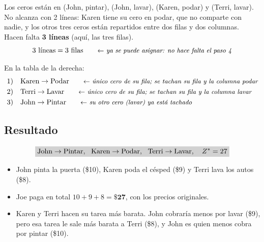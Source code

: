 \documentclass[11pt,a4paper]{article}
\newcommand{\marco}[3]{%
  \foreach \i in {2,...,#2} \foreach \j in {2,...,#3}
    \draw[gray!60, very thin] (#1-\i-\j.north west) rectangle (#1-\i-\j.south east);
  \draw[semithick] (#1-2-2.north west) rectangle (#1-#2-#3.south east);}
\newcommand{\tfila}[3]{\draw[tapa] (#1-#2-2.west) -- (#1-#2-#3.east);}
\newcommand{\pie}[2]{\node[below=1.5mm of #1, font=\scriptsize\itshape] {#2};}
\newcommand{\cero}[1]{\node[asig] at (#1) {};}
\newcommand{\flecha}[3]{\draw[-{Stealth[length=2.4mm]}, thick] (#1.east) -- node[above, font=\scriptsize, align=center] {#3} (#1.east -| #2.west);}
\begin{document}
\begin{center}
\end{center}
Los ceros están en (John, pintar), (John, lavar), (Karen, podar) y (Terri, lavar). No alcanza con 2 líneas: Karen
tiene su cero en podar, que no comparte con nadie, y los otros tres ceros están repartidos entre dos filas y dos
columnas. Hacen falta \textbf{3 líneas} (aquí, las tres filas).
\[
3 \text{ líneas} = 3 \text{ filas} \nota{ya se puede asignar: no hace falta el paso 4}
\]

En la tabla de la derecha:
\begin{align*}
1)\quad & \text{Karen} \to \text{Podar} \nota{único cero de su fila; se tachan su fila y la columna podar}\\
2)\quad & \text{Terri} \to \text{Lavar} \nota{único cero de su fila; se tachan su fila y la columna lavar}\\
3)\quad & \text{John} \to \text{Pintar} \nota{su otro cero (lavar) ya está tachado}
\end{align*}

\subsection*{Resultado}
\[
\res{\text{John} \to \text{Pintar},\ \ \text{Karen} \to \text{Podar},\ \ \text{Terri} \to \text{Lavar},\quad Z^* = 27}
\]
\begin{itemize}[itemsep=2pt]
  \item John pinta la puerta (\$10), Karen poda el césped (\$9) y Terri lava los autos (\$8).
  \item Joe paga en total $10 + 9 + 8 = \mathbf{\$27}$, con los precios originales.
  \item Karen y Terri hacen su tarea más barata. John cobraría menos por lavar (\$9), pero esa tarea le sale más
        barata a Terri (\$8), y John es quien menos cobra por pintar (\$10).
\end{itemize}
\end{document}
